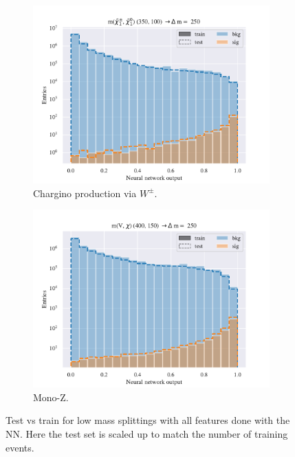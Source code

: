 \begin{figure}[H]
    \begin{subfigure}[t!]{0.49\textwidth}
        \includegraphics[width = \textwidth]{Figures/WW/NN/All_level/Inter/scaled_train_test_395320.pdf}
        \caption{Chargino production via $W^\pm$.}
        \label{fig:WWNNInter}
    \end{subfigure}
    \begin{subfigure}[t!]{0.49\textwidth}
        \includegraphics[width = \textwidth]{Figures/Mono_Z/ML/NN/All_level/Inter/scaled_train_test_310613.pdf}
        \caption{Mono-Z.}
        \label{fig:MonoZNNInter}
    \end{subfigure}
    \caption{Test vs train for low mass splittings with all features done with the NN. Here the test set is scaled up to match the number of training events.}
    \label{fig:AllInterNN}
\end{figure}


